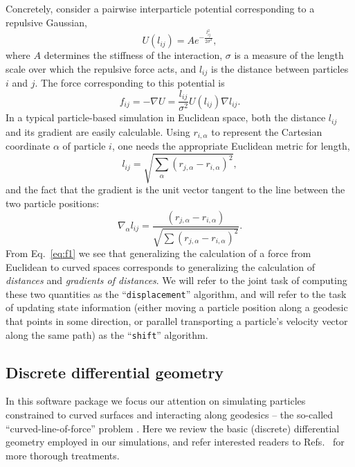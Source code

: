 \documentclass[preprint,12pt]{elsarticle}
\newcounter{bla}
\begin{document}
Concretely, consider a pairwise interparticle potential corresponding to a repulsive Gaussian,
\begin{equation}
    U(l_{ij}) = A e^{-\frac{l_{ij}^2}{2 \sigma^2}},
\end{equation}
where $A$ determines the stiffness of the interaction, $\sigma$ is a measure of the length scale over which the repulsive force acts, and $l_{ij}$ is the distance between particles $i$ and $j$. The force corresponding to this potential is
\begin{equation}\label{eq:f1}
    f_{ij} = -\nabla U = \frac{l_{ij}}{\sigma^2}U(l_{ij})\nabla l_{ij}. 
\end{equation}
In a typical particle-based simulation in Euclidean space, both the distance $l_{ij}$ and its gradient are easily calculable. Using $r_{i,\alpha}$ to represent the Cartesian coordinate $\alpha$ of particle $i$, one needs the appropriate Euclidean metric for length,
\begin{equation}\label{eq:euclideanDistance}
    l_{ij} = \sqrt{\sum_\alpha{\left(r_{j,\alpha}- r_{i,\alpha}\right)^2}},
\end{equation}
and the fact that the gradient is the unit vector tangent to the line between the two particle positions: 
\begin{equation}
    \nabla_\alpha l_{ij} = \frac{(r_{j,\alpha} - r_{i,\alpha})}{\sqrt{\sum{\left(r_{j,\alpha}- r_{i,\alpha}\right)^2}}}. 
\end{equation}
From Eq.~\ref{eq:f1} we see that generalizing the calculation of a force from Euclidean to curved spaces corresponds to generalizing the calculation of \emph{distances} and \emph{gradients of distances}. We will refer to the joint task of computing these two quantities as the ``\verb+displacement+'' algorithm, and will refer to the task of updating state information (either moving a particle position along a geodesic that points in some direction, or parallel transporting a particle's velocity vector along the same path) as the ``\verb+shift+'' algorithm. 

\subsection{Discrete differential geometry}
In this software package we focus our attention on simulating particles constrained to curved surfaces and interacting along geodesics -- the so-called ``curved-line-of-force'' problem \cite{tarjus2011statistical,post1986statistical}. Here we review the basic (discrete) differential geometry employed in our simulations, and refer interested readers to Refs.~\cite{kamien2002geometry,needham2021visual} for more thorough treatments. 
\end{document}
